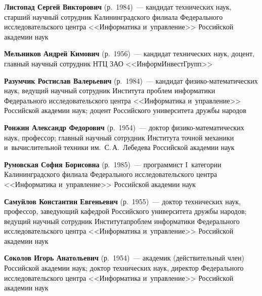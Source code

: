 \begin{multicols}{2}
\vspace*{3pt}

\noindent
\textbf{Листопад Сергей Викторович} (р.\ 1984)~---
кандидат технических наук, старший научный сотрудник 
Калининградского филиала Федерального исследовательского центра 
<<Информатика и~управ\-ле\-ние>> Российской академии наук

\vspace*{3pt}

\noindent
\textbf{Мельников Андрей Кимович} (р.\ 1956)~--- кандидат технических наук, доцент, 
главный научный сотрудник НТЦ ЗАО <<ИнформИнвестГрупп>>

\vspace*{3pt}

\noindent
\textbf{Разумчик Ростислав Валерьевич} (р.\  1984)~--- 
кандидат фи\-зи\-ко-ма\-те\-ма\-ти\-че\-ских наук, ведущий научный сотрудник 
Института проб\-лем информатики Федерального исследовательского центра 
<<Информатика и~управ\-ле\-ние>> Российской академии наук; 
доцент Российского университета дружбы народов

\vspace*{3pt}

\noindent
\textbf{Ронжин Александр Федорович} (р.\ 1954)~--- доктор фи\-зи\-ко-ма\-те\-ма\-ти\-че\-ских наук, 
профессор; главный научный сотрудник Института точной механики и~вычислительной 
техники им.\ С.\,А.~Лебедева Российской академии наук

\vspace*{3pt}

\noindent
\textbf{Румовская София Борисовна} (р.\ 1985)~---
программист I~категории Калининградского филиала Федерального исследовательского 
центра <<Информатика и~управ\-ле\-ние>> Российской академии наук


\vspace*{3pt}

\noindent
\textbf{Самуйлов Константин Евгеньевич} (р.\ 1955)~--- доктор технических наук, 
профессор, заведующий кафедрой Российского университета дружбы народов; 
ведущий научный сотрудник Института\linebreak проб\-лем информатики Федерального 
исследовательского центра <<Информатика и~управ\-ле\-ние>> 
Российской академии наук

\vspace*{3pt}

\noindent
\textbf{Соколов Игорь Анатольевич} (р.\ 1954)~---
 академик (действительный член) Российской академии наук; доктор технических наук, 
 директор Федерального исследовательского центра <<Информатика и~управ\-ле\-ние>> 
 Российской академии наук


\end{multicols}
